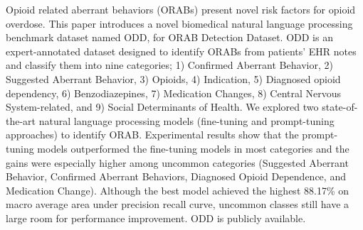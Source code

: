 Opioid related aberrant behaviors (ORABs) present novel risk factors for opioid overdose. This paper introduces a novel biomedical natural language processing benchmark dataset named ODD, for ORAB Detection Dataset. ODD is an expert-annotated dataset designed to identify ORABs from patients' EHR notes and classify them into nine categories; 1) Confirmed Aberrant Behavior, 2) Suggested Aberrant Behavior, 3) Opioids, 4) Indication, 5) Diagnosed opioid dependency, 6) Benzodiazepines, 7) Medication Changes, 8) Central Nervous System-related, and 9) Social Determinants of Health. We explored two state-of-the-art natural language processing models (fine-tuning and prompt-tuning approaches) to identify ORAB. Experimental results show that the prompt-tuning models outperformed the fine-tuning models in most categories and the gains were especially higher among uncommon categories (Suggested Aberrant Behavior, Confirmed Aberrant Behaviors, Diagnosed Opioid Dependence, and Medication Change). Although the best model achieved the highest 88.17\% on macro average area under precision recall curve, uncommon classes still have a large room for performance improvement. ODD is publicly available.